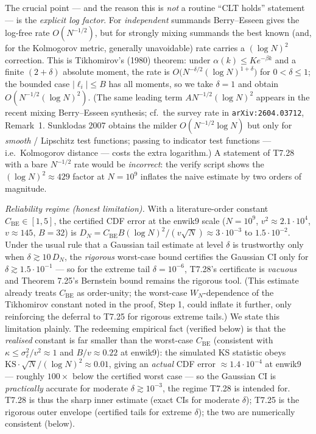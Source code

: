 \documentclass[
]{article}
\begin{document}
The crucial point --- and the reason this is \emph{not} a routine
``CLT holds'' statement --- is the \emph{explicit log factor}. For
\emph{independent} summands Berry--Esseen gives the log-free rate
$O(N^{-1/2})$, but for strongly mixing summands the best known (and,
for the Kolmogorov metric, generally unavoidable) rate carries a
$(\log N)^2$ correction. This is Tikhomirov's (1980) theorem: under
$\alpha(k) \leq K e^{-\beta k}$ and a finite $(2+\delta)$ absolute
moment, the rate is $O\bigl(N^{-\delta/2}(\log N)^{1+\delta}\bigr)$ for
$0 < \delta \leq 1$; the bounded case $|\ell_i| \leq B$ has all moments,
so we take $\delta = 1$ and obtain $O(N^{-1/2}(\log N)^2)$. (The same
leading term $A N^{-1/2}(\log N)^2$ appears in the recent mixing
Berry--Esseen synthesis; cf.\ the survey rate in
\texttt{arXiv:2604.03712}, Remark~1. Sunklodas 2007 obtains the milder
$O(N^{-1/2}\log N)$ but only for \emph{smooth} / Lipschitz test
functions; passing to indicator test functions --- i.e.\ Kolmogorov
distance --- costs the extra logarithm.) A statement of T7.28 with a
bare $N^{-1/2}$ rate would be \emph{incorrect}: the verify script shows
the $(\log N)^2 \approx 429$ factor at $N = 10^9$ inflates the naive
estimate by two orders of magnitude.

\emph{Reliability regime (honest limitation).} With a literature-order
constant $C_{\mathrm{BE}} \in [1, 5]$, the certified CDF error at the
enwik9 scale ($N = 10^9$, $v^2 \approx 2.1 \cdot 10^4$, $v \approx
145$, $B = 32$) is $D_N = C_{\mathrm{BE}} B (\log N)^2 / (v\sqrt{N})
\approx 3 \cdot 10^{-3}$ to $1.5 \cdot 10^{-2}$. Under the usual rule
that a Gaussian tail estimate at level $\delta$ is trustworthy only
when $\delta \gtrsim 10\,D_N$, the \emph{rigorous} worst-case bound
certifies the Gaussian CI only for $\delta \gtrsim 1.5 \cdot 10^{-1}$
--- so for the extreme tail $\delta = 10^{-6}$, T7.28's certificate is
\emph{vacuous} and Theorem 7.25's Bernstein bound remains the rigorous
tool. (This estimate already treats $C_{\mathrm{BE}}$ as order-unity;
the worst-case $W_N$-dependence of the Tikhomirov constant noted in the
proof, Step 1, could inflate it further, only reinforcing the deferral
to T7.25 for rigorous extreme tails.) We state this limitation plainly.
The redeeming empirical fact
(verified below) is that the \emph{realised} constant is far smaller
than the worst-case $C_{\mathrm{BE}}$ (consistent with $\kappa \leq
\sigma_\ell^2/v^2 \approx 1$ and $B/v \approx 0.22$ at enwik9): the
simulated KS statistic obeys $\mathrm{KS} \cdot \sqrt{N} / (\log N)^2
\approx 0.01$, giving an \emph{actual} CDF error $\approx 1.4 \cdot
10^{-4}$ at enwik9 --- roughly $100\times$ below the certified worst
case --- so the Gaussian CI is \emph{practically} accurate for moderate
$\delta \gtrsim 10^{-3}$, the regime T7.28 is intended for. T7.28 is
thus the sharp inner estimate (exact CIs for moderate $\delta$); T7.25
is the rigorous outer envelope (certified tails for extreme $\delta$);
the two are numerically consistent (below).
\end{document}
